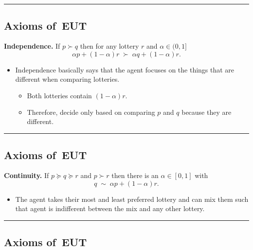 \documentclass[
  letterpaper,
  DIV=11,
  numbers=noendperiod]{scrartcl}
\providecommand{\tightlist}{%
  \setlength{\itemsep}{0pt}\setlength{\parskip}{0pt}}\usepackage{longtable,booktabs,array}
\begin{document}
\begin{center}\rule{0.5\linewidth}{0.5pt}\end{center}

\subsection{Axioms of~EUT}\label{axioms-of-eut-3}

\label{ax:independence}
\textbf{Independence.} If \(p \succ q\) then for any lottery \(r\) and
\(\alpha\in(0,1]\)
\[\alpha p+(1-\alpha)r \;\succ\; \alpha q+(1-\alpha)r.\]

\begin{itemize}
\tightlist
\item
  Independence basically says that the agent focuses on the things that
  are different when comparing lotteries.

  \begin{itemize}
  \tightlist
  \item
    Both lotteries contain \((1-\alpha)r\).
  \item
    Therefore, decide only based on comparing \(p\) and \(q\) because
    they are different.
  \end{itemize}
\end{itemize}

\begin{center}\rule{0.5\linewidth}{0.5pt}\end{center}

\subsection{Axioms of~EUT}\label{axioms-of-eut-4}

\label{ax:continuity}
\textbf{Continuity.} If \(p\succeq q\succeq r\) and \(p\succ r\) then
there is an \(\alpha\in[0,1]\) with
\[q\;\sim\; \alpha p + (1-\alpha)r.\]

\begin{itemize}
\tightlist
\item
  The agent takes their most and least preferred lottery and can mix
  them such that agent is indifferent between the mix and any other
  lottery.
\end{itemize}

\begin{center}\rule{0.5\linewidth}{0.5pt}\end{center}

\subsection{Axioms of~EUT}\label{axioms-of-eut-5}
\end{document}
